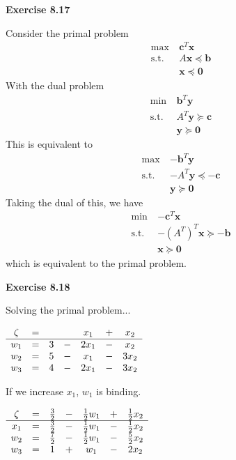 \documentclass[letterpaper,12pt]{article}
\newcommand{\vect}[1]{\mathbf{#1}}
\begin{document}
\textbf{Exercise 8.17}

Consider the primal problem
\begin{align*}
\max \ & \vect{c}^T \vect{x} \\
\text{s.t.} \ & A \vect{x} \preceq \vect{b} \\
& \vect{x} \preceq \vect{0}
\end{align*}
With the dual problem
\begin{align*}
\min \ & \vect{b}^T \vect{y} \\
\text{s.t.} \ & A^T \vect{y} \succeq \vect{c} \\
& \vect{y} \succeq \vect{0}
\end{align*}
This is equivalent to
\begin{align*}
\max \ & \vect{-b}^T \vect{y} \\
\text{s.t.} \ & -A^T \vect{y} \preceq -\vect{c} \\
& \vect{y} \succeq \vect{0}
\end{align*}
Taking the dual of this, we have
\begin{align*}
\min \ & \vect{-c}^T \vect{x} \\
\text{s.t.} \ & -(A^T)^T \vect{x} \succeq -\vect{b} \\
& \vect{x} \succeq \vect{0}
\end{align*}
which is equivalent to the primal problem.

\textbf{Exercise 8.18}

Solving the primal problem...
\begin{center}
	$\begin{array}{ c c c c c c c c  }
	\zeta & = & & & x_1 & + & x_2 \\
	\hline
	w_1 & = & 3 & - & 2x_1 & - & x_2 \\
	w_2 & = & 5 & - & x_1 & - & 3x_2 \\
	w_3 & = & 4 & - & 2x_1 & - & 3x_2 \\
	\end{array}$ \\
\end{center}

If we increase $x_1$, $w_1$ is binding. \\

\begin{center}
	$\begin{array}{ c c c c c c c c  }
	\zeta & = & \frac{3}{2} & - & \frac{1}{2}w_1 & + & \frac{1}{2}x_2 \\
	\hline
	x_1 & = & \frac{3}{2} & - & \frac{1}{2}w_1 & - & \frac{1}{2}x_2 \\
	w_2 & = & \frac{7}{2} & - & \frac{1}{2}w_1 & - & \frac{5}{2}x_2 \\
	w_3 & = & 1 & + & w_1 & - & 2x_2 \\
	\end{array}$ \\
\end{center}
\end{document}
